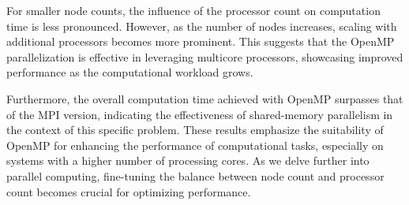 \documentclass[10pt]{article}
\begin{document}
For smaller node counts, the influence of the processor count on computation time is less pronounced. However, as the number of nodes increases, scaling with additional processors becomes more prominent. This suggests that the OpenMP parallelization is effective in leveraging multicore processors, showcasing improved performance as the computational workload grows.

Furthermore, the overall computation time achieved with OpenMP surpasses that of the MPI version, indicating the effectiveness of shared-memory parallelism in the context of this specific problem. These results emphasize the suitability of OpenMP for enhancing the performance of computational tasks, especially on systems with a higher number of processing cores. As we delve further into parallel computing, fine-tuning the balance between node count and processor count becomes crucial for optimizing performance.
\end{document}
